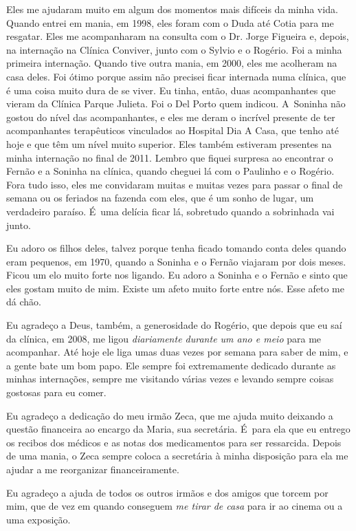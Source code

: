 Eles me ajudaram muito em algum dos momentos mais difíceis da minha
vida. Quando entrei em mania, em 1998, eles foram com o Duda até Cotia
para me resgatar. Eles me acompanharam na consulta com o Dr. Jorge
Figueira e, depois, na internação na Clínica Conviver, junto com o
Sylvio e o Rogério. Foi a minha primeira internação. Quando tive outra
mania, em 2000, eles me acolheram na casa deles. Foi ótimo porque assim
não precisei ficar internada numa clínica, que é uma coisa muito dura de
se viver. Eu tinha, então, duas acompanhantes que vieram da Clínica
Parque Julieta. Foi o Del Porto quem indicou. A~Soninha não gostou do
nível das acompanhantes, e eles me deram o incrível presente de ter
acompanhantes terapêuticos vinculados ao Hospital Dia A Casa, que tenho
até hoje e que têm um nível muito superior. Eles também estiveram
presentes na minha internação no final de 2011. Lembro que fiquei
surpresa ao encontrar o Fernão e a Soninha na clínica, quando cheguei lá
com o Paulinho e o Rogério. Fora tudo isso, eles me convidaram muitas e
muitas vezes para passar o final de semana ou os feriados na fazenda com
eles, que é um sonho de lugar, um verdadeiro paraíso. É~uma delícia
ficar lá, sobretudo quando a sobrinhada vai junto.

Eu adoro os filhos deles, talvez porque tenha ficado tomando conta deles
quando eram pequenos, em 1970, quando a Soninha e o Fernão viajaram por
dois meses. Ficou um elo muito forte nos ligando. Eu adoro a Soninha e o
Fernão e sinto que eles gostam muito de mim. Existe um afeto muito forte
entre nós. Esse afeto me dá chão.

Eu agradeço a Deus, também, a generosidade do Rogério, que depois que eu
saí da clínica, em 2008, me ligou \emph{diariamente durante um ano e
meio} para me acompanhar. Até hoje ele liga umas duas vezes por semana
para saber de mim, e a gente bate um bom papo. Ele sempre foi
extremamente dedicado durante as minhas internações, sempre me visitando
várias vezes e levando sempre coisas gostosas para eu comer.

Eu agradeço a dedicação do meu irmão Zeca, que me ajuda muito deixando a
questão financeira ao encargo da Maria, sua secretária. É~para ela que
eu entrego os recibos dos médicos e as notas dos medicamentos para ser
ressarcida. Depois de uma mania, o Zeca sempre coloca a secretária à
minha disposição para ela me ajudar a me reorganizar financeiramente.

Eu agradeço a ajuda de todos os outros irmãos e dos amigos que torcem
por mim, que de vez em quando conseguem \emph{me tirar de casa} para ir
ao cinema ou a uma exposição.

